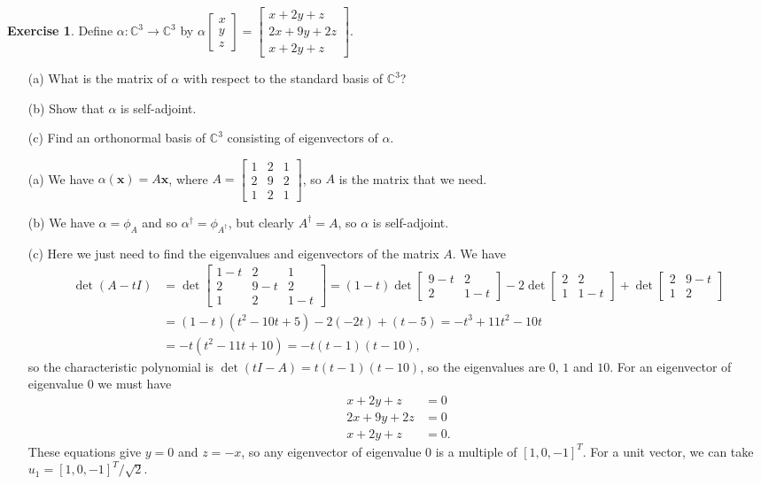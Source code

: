 \documentclass{amsart}
\newcommand{\C}         {{\mathbb{C}}}
\newcommand{\bsm}       {\left[\begin{smallmatrix}}
\newcommand{\esm}       {\end{smallmatrix}\right]}
\newcommand{\al}        {\alpha}
\newcommand{\vx}        {\mathbf{x}}
\renewcommand{\:}       {\colon}
\theoremstyle{definition}
\newtheorem{exercise}{Exercise}[section]
\renewenvironment{solution}{\SolutionAtEnd}{\endSolutionAtEnd}
\begin{document}
\begin{exercise}
 Define $\al\:\C^3\to\C^3$ by 
 $\displaystyle\al\bsm x\\ y\\ z\esm =
  \bsm x+2y+z\\ 2x+9y+2z\\ x+2y+z\esm$.
 \begin{itemize}
  \item[(a)] What is the matrix of $\al$ with respect to the standard
   basis of $\C^3$?
  \item[(b)] Show that $\al$ is self-adjoint.
  \item[(c)] Find an orthonormal basis of $\C^3$ consisting of
   eigenvectors of $\al$.
 \end{itemize}
\end{exercise}
\begin{solution}
 \begin{itemize}
  \item[(a)] We have $\al(\vx)=A\vx$, where 
   $\displaystyle A=\bsm 1&2&1\\ 2&9&2\\ 1&2&1\esm$, so $A$ is the
   matrix that we need.
  \item[(b)] We have $\al=\phi_A$ and so $\al^\dag=\phi_{A^\dag}$, but
   clearly $A^\dag=A$, so $\al$ is self-adjoint.
  \item[(c)] Here we just need to find the eigenvalues and
   eigenvectors of the matrix $A$.  We have
   \begin{align*}
    \det(A-tI) &=
       \det\bsm 1-t & 2 & 1 \\ 2 & 9-t & 2 \\ 1 & 2 & 1-t \esm 
     = (1-t)\det\bsm 9-t & 2 \\ 2 & 1-t \esm 
         -2 \det\bsm 2 & 2 \\ 1 & 1-t \esm 
          + \det\bsm 2 & 9-t \\ 1 & 2 \esm \\
    &= (1-t)(t^2-10t+5)  - 2(-2t) + (t-5) 
     = -t^3 + 11t^2 - 10t  \\
    &= -t(t^2-11t+10) = -t(t-1)(t-10),
   \end{align*}
   so the characteristic polynomial is $\det(tI-A)=t(t-1)(t-10)$, so
   the eigenvalues are $0$, $1$ and $10$.  For an eigenvector of
   eigenvalue $0$ we must have 
   \begin{align*}
    x+2y+z &= 0 \\
    2x+9y+2z &= 0 \\
    x+2y+z &= 0.
   \end{align*}
   These equations give $y=0$ and $z=-x$, so any eigenvector of
   eigenvalue $0$ is a multiple of $[1,0,-1]^T$.  For a unit vector,
   we can take $u_1=[1,0,-1]^T/\sqrt{2}$.


\end{itemize}
\end{solution}
\end{document}
